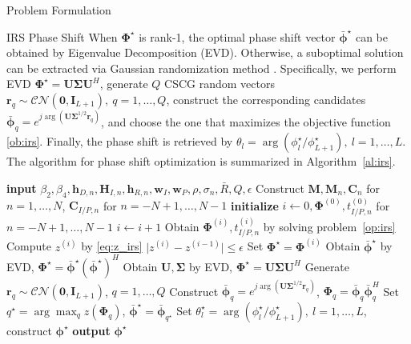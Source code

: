 \documentclass[journal]{IEEEtran}
\begin{document}
\begin{section}{Problem Formulation}
\begin{subsection}{IRS Phase Shift}
			When $\boldsymbol{\Phi}^{\star}$ is rank-\num{1}, the optimal phase shift vector $\bar{\boldsymbol{\phi}}^\star$ can be obtained by Eigenvalue Decomposition (EVD). Otherwise, a suboptimal solution can be extracted via Gaussian randomization method \cite{Huang2010}. Specifically, we perform EVD $\boldsymbol{\Phi}^{\star}=\boldsymbol{U}\boldsymbol{\Sigma}\boldsymbol{U}^H$, generate $Q$ CSCG random vectors $\boldsymbol{r}_q \sim \mathcal{CN}(\boldsymbol{0},\boldsymbol{I}_{L+1}),\ q=1,\dots,Q$, construct the corresponding candidates $\bar{\boldsymbol{\phi}}_q=e^{j\arg\left(\boldsymbol{U}\boldsymbol{\Sigma}^{1/2}\boldsymbol{r}_q\right)}$, and choose the one that maximizes the objective function \ref{ob:irs}. Finally, the phase shift is retrieved by $\theta_l=\arg(\phi_l^\star/\phi_{L+1}^\star), \ l=1,\dots,L$. The algorithm for phase shift optimization is summarized in Algorithm~\ref{al:irs}.
			\begin{algorithm}[!t]
				\caption{SCA: IRS Phase Shift}
				\label{al:irs}
				\begin{algorithmic}[1]
					\State \textbf{input} $\beta_2,\beta_4,\boldsymbol{h}_{D,n},\boldsymbol{H}_{I,n},\boldsymbol{h}_{R,n},\boldsymbol{w}_I,\boldsymbol{w}_P,\rho,\sigma_n,\bar{R},Q,\epsilon$
					\State Construct $\boldsymbol{M},\boldsymbol{M}_n,\boldsymbol{C}_{n}$ for $n=1,\dots,N$, $\boldsymbol{C}_{I/P,n}$ for $n=-N+1,\dots,N-1$
					\State \textbf{initialize} $i \gets 0,\boldsymbol{\Phi}^{(0)},t_{I/P,n}^{(0)}$ for $n=-N+1,\dots,N-1$
					\Repeat
						\State $i \gets i + 1$
						\State Obtain $\boldsymbol{\Phi}^{(i)}, t_{I/P,n}^{(i)}$ by solving problem~\ref{op:irs}
						\State Compute $z^{(i)}$ by \ref{eq:z_irs}
					\Until $\lvert z^{(i)}-z^{(i-1)} \rvert \le \epsilon$
					\State Set $\boldsymbol{\Phi}^{\star}=\boldsymbol{\Phi}^{(i)}$
						\State Obtain $\bar{\boldsymbol{\phi}}^\star$ by EVD, $\boldsymbol{\Phi}^{\star}=\bar{\boldsymbol{\phi}}^\star(\bar{\boldsymbol{\phi}}^\star)^H$
					\Else
						\State Obtain $\boldsymbol{U},\boldsymbol{\Sigma}$ by EVD, $\boldsymbol{\Phi}^{\star}=\boldsymbol{U}\boldsymbol{\Sigma}\boldsymbol{U}^H$
						\State Generate $\boldsymbol{r}_q \sim \mathcal{CN}(\boldsymbol{0},\boldsymbol{I}_{L+1})$, $q=1,\dots,Q$
						\State Construct $\bar{\boldsymbol{\phi}}_q=e^{j\arg\left(\boldsymbol{U}\boldsymbol{\Sigma}^{1/2}\boldsymbol{r}_q\right)}$, $\boldsymbol{\Phi}_q=\bar{\boldsymbol{\phi}}_q\bar{\boldsymbol{\phi}}_q^H$
						\State Set $q^{\star}=\arg\max_q{z(\boldsymbol{\Phi}_q)}$, $\bar{\boldsymbol{\phi}}^\star=\bar{\boldsymbol{\phi}}_{q^{\star}}$
					\EndIf
					\State Set $\theta_l^\star=\arg(\phi_l^\star/\phi_{L+1}^\star), \ l=1,\dots,L$, construct $\boldsymbol{\phi}^{\star}$
					\State \textbf{output} $\boldsymbol{\phi}^{\star}$
				\end{algorithmic}
			\end{algorithm}
		\end{subsection}



\end{section}
\end{document}
